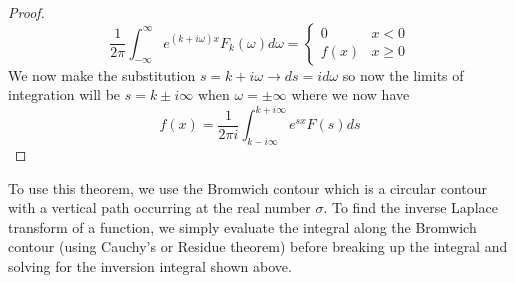 \documentclass{report}
\theoremstyle{definition}
\theoremstyle{remark}
\begin{document}
\begin{proof}
\begin{equation*}
    \frac{1}{2\pi}\int^\infty_{-\infty}e^{(k+i\omega )x}F_k(\omega)d \omega = \begin{cases}
        0 &x<0 \\f(x)&x\geq 0
    \end{cases}
\end{equation*}
We now make the substitution $s=k+i\omega\rightarrow ds = id\omega$ so now the limits of integration will be $s=k\pm i\infty$ when $\omega=\pm \infty$ where we now have 
\begin{equation*}
    f(x)=\frac{1}{2\pi i}\int^{k+i\infty}_{k-i\infty}e^{sx}F(s)ds
\end{equation*}

\end{proof}
To use this theorem, we use the Bromwich contour which is a circular contour with a vertical path occurring at the real number $\sigma$. To find the inverse Laplace transform of a function, we simply evaluate the integral along the Bromwich contour (using Cauchy's or Residue theorem) before breaking up the integral and solving for the inversion integral shown above. 
\end{document}
